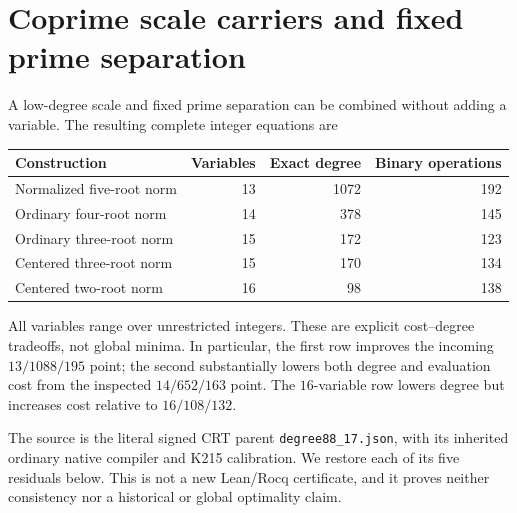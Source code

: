 \section{Coprime scale carriers and fixed prime separation}
\label{sec:r13-radicals}

A low-degree scale and fixed prime separation can be combined without
adding a variable. The resulting complete integer equations are
\begin{center}
\begin{tabular}{lrrr}\toprule
Construction & Variables & Exact degree & Binary operations\\\midrule
Normalized five-root norm &13&1072&192\\
Ordinary four-root norm &14&378&145\\
Ordinary three-root norm &15&172&123\\
Centered three-root norm &15&170&134\\
Centered two-root norm &16&98&138\\\bottomrule
\end{tabular}
\end{center}
All variables range over unrestricted integers. These are explicit
cost--degree tradeoffs, not global minima. In particular, the first row
improves the incoming $13/1088/195$ point; the second substantially lowers
both degree and evaluation cost from the inspected $14/652/163$ point.
The $16$-variable row lowers degree but increases cost relative to
$16/108/132$.

The source is the literal signed CRT parent
\texttt{degree88\_17.json}, with its inherited ordinary native compiler
and K215 calibration. We restore each of its five residuals below.
This is not a new Lean/Rocq certificate, and it proves neither consistency
nor a historical or global optimality claim.

